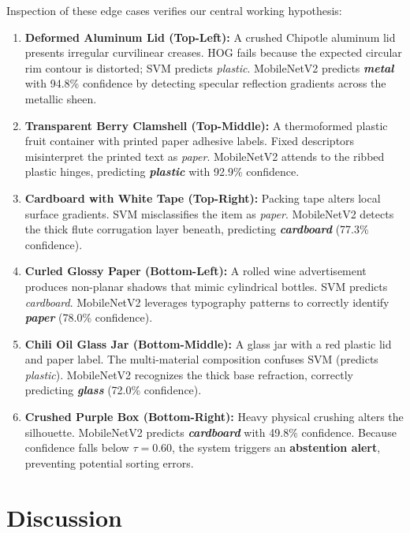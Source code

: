 \documentclass[11pt,a4paper]{article}
\begin{document}
Inspection of these edge cases verifies our central working hypothesis:
\begin{enumerate}[label=\arabic*.]
    \item \textbf{Deformed Aluminum Lid (Top-Left):} A crushed Chipotle aluminum lid presents irregular curvilinear creases. HOG fails because the expected circular rim contour is distorted; SVM predicts \textit{plastic}. MobileNetV2 predicts \textbf{\textit{metal}} with 94.8\% confidence by detecting specular reflection gradients across the metallic sheen.
    \item \textbf{Transparent Berry Clamshell (Top-Middle):} A thermoformed plastic fruit container with printed paper adhesive labels. Fixed descriptors misinterpret the printed text as \textit{paper}. MobileNetV2 attends to the ribbed plastic hinges, predicting \textbf{\textit{plastic}} with 92.9\% confidence.
    \item \textbf{Cardboard with White Tape (Top-Right):} Packing tape alters local surface gradients. SVM misclassifies the item as \textit{paper}. MobileNetV2 detects the thick flute corrugation layer beneath, predicting \textbf{\textit{cardboard}} (77.3\% confidence).
    \item \textbf{Curled Glossy Paper (Bottom-Left):} A rolled wine advertisement produces non-planar shadows that mimic cylindrical bottles. SVM predicts \textit{cardboard}. MobileNetV2 leverages typography patterns to correctly identify \textbf{\textit{paper}} (78.0\% confidence).
    \item \textbf{Chili Oil Glass Jar (Bottom-Middle):} A glass jar with a red plastic lid and paper label. The multi-material composition confuses SVM (predicts \textit{plastic}). MobileNetV2 recognizes the thick base refraction, correctly predicting \textbf{\textit{glass}} (72.0\% confidence).
    \item \textbf{Crushed Purple Box (Bottom-Right):} Heavy physical crushing alters the silhouette. MobileNetV2 predicts \textbf{\textit{cardboard}} with 49.8\% confidence. Because confidence falls below $\tau = 0.60$, the system triggers an \textbf{abstention alert}, preventing potential sorting errors.
\end{enumerate}

\section{Discussion}
\end{document}
